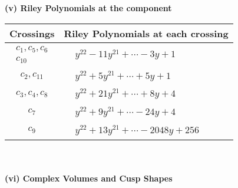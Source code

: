 \documentclass[1p]{elsarticle_modified}
\theoremstyle{definition}
\begin{document}
\newpage\renewcommand{\arraystretch}{1}
\flushleft \textbf{(v) Riley Polynomials at the component}\newline \\
\begin{tabular}{m{50pt}|m{274pt}}
Crossings & \hspace{64pt}Riley Polynomials at each crossing \\
\hline $$\begin{aligned}c_{1},c_{5},c_{6}\\c_{10}\end{aligned}$$&$\begin{aligned}
&y^{22}-11 y^{21}+\cdots-3 y+1
\end{aligned}$\\
\hline $$\begin{aligned}c_{2},c_{11}\end{aligned}$$&$\begin{aligned}
&y^{22}+5 y^{21}+\cdots+5 y+1
\end{aligned}$\\
\hline $$\begin{aligned}c_{3},c_{4},c_{8}\end{aligned}$$&$\begin{aligned}
&y^{22}+21 y^{21}+\cdots+8 y+4
\end{aligned}$\\
\hline $$\begin{aligned}c_{7}\end{aligned}$$&$\begin{aligned}
&y^{22}+9 y^{21}+\cdots-24 y+4
\end{aligned}$\\
\hline $$\begin{aligned}c_{9}\end{aligned}$$&$\begin{aligned}
&y^{22}+13 y^{21}+\cdots-2048 y+256
\end{aligned}$\\
\hline
\end{tabular}\\~\\
\newpage\flushleft \textbf{(vi) Complex Volumes and Cusp Shapes}
\end{document}
